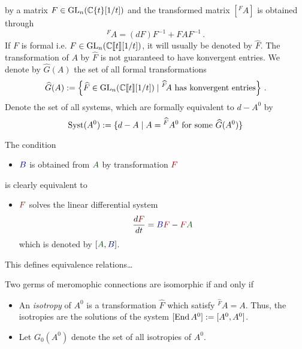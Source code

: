 by a matrix $F\in\operatorname{GL}_n(\mathbb{C}\{t\}[1/t])$ and the transformed matrix $[{}^F\!A]$ is
obtained through
\[
  {}^F\!A=(dF)F^{-1} + FAF^{-1} \,.
\]
If $F$ is formal i.e. $F\in\operatorname{GL}_n(\mathbb{C}\llbracket t\rrbracket[1/t])$, it will
usually be denoted by $\hat F$. The transformation of $A$ by $\hat F$ is not
guaranteed to have konvergent entries. We denote by $\hat G(A)$ the set of all
formal transformations
\[
  \widehat G(A):=\left\{\widehat F\in\operatorname{GL}_n(\mathbb{C}\llbracket t\rrbracket[1/t])
    \mid {}^{\widehat F}\!A \text{ has konvergent entries}
  \right\}\,.
\]
Denote the set of all systems, which are formally equivalent to $d-A^0$ by
\[
  \operatorname{Syst}(A^0):=\{d-A \mid A={}^{\widehat F}A^0 \text{ for some }\widehat G(A^0)\}
\]
\begin{rem}
  \def\myB{\textcolor{blue!60!black}{B}}
  \def\myA{\textcolor{green!30!black}{A}}
  \def\myF{\textcolor{red!60!black}{F}}
  The condition 
  \begin{itemize}
    \item[] $\myB$ is obtained from $\myA$ by transformation $\myF$
  \end{itemize}
  is clearly equivalent to
  \begin{itemize}
    \item[]  $\myF$ solves the linear differential system
      \[
        \frac{d\myF}{dt}=\myB\myF-\myF\myA
      \]
      which is denoted by $[\myA,\myB]$.
  \end{itemize}
\end{rem}

This defines equivalence relations\dots \TODO

\begin{defn}
  Two germs of meromophic connections are isomorphic if and only if \TODO
\end{defn}

\begin{defn}
  \begin{itemize}
    \item An \emph{isotropy} of $A^0$ is a transformation $\hat F$ which
      satisfy ${}^{\hat F}\!A=A$. Thus, the isotropies are the solutions of the
      system $[\operatorname{End} A^0]:=[A^0,A^0]$.
    \item Let $G_0(A^0)$ denote the set of all isotropies of $A^0$.
  \end{itemize}
\end{defn}


